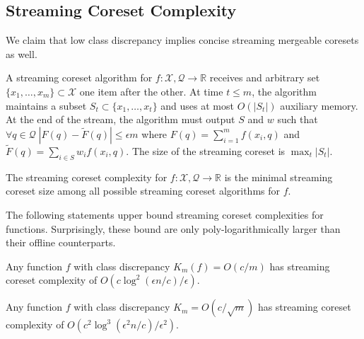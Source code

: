 \documentclass[anon,12pt]{colt2019} %
\newcommand{\R}{\mathbb{R}}
\newcommand{\eps}{\epsilon}
\newcommand{\X}{\mathcal{X}}
\newcommand{\Q}{\mathcal{Q}}
\begin{document}
\subsection{Streaming Coreset Complexity}\label{sec:sketch}
We claim that low class discrepancy implies concise streaming mergeable coresets as well. 
%
\begin{definition}  
A streaming coreset algorithm for $f:\X,\Q \rightarrow \R$ receives and arbitrary set $\{x_1,\ldots,x_m\} \subset \X$ one item after the other.
At time $t \le m$, the algorithm maintains a subset $S_t \subset \{x_1,\ldots,x_t\}$ and uses at most $O(|S_t|)$ auxiliary memory. 
At the end of the stream, the algorithm must output $S$ and $w$ such that  $\forall q \in \Q \; |F(q)  - \tilde F(q)| \le \eps m$ where 
$F(q) = \sum_{i=1}^{m} f(x_i,q)$ and $\tilde F(q) = \sum_{i \in S}w_i f(x_i,q)$.
The size of the streaming coreset is $\max_t |S_t|$.
\end{definition}

\begin{definition}  
The streaming coreset complexity for $f:\X,\Q \rightarrow \R$ is the minimal streaming coreset size among all possible 
streaming coreset algorithms for $f$.
\end{definition}


\noindent The following statements upper bound streaming coreset complexities for functions. Surprisingly, these bound are only poly-logarithmically larger than their offline counterparts. 

\begin{theorem} \label{thm:streaming11}
Any function $f$ with class discrepancy $K_m(f) = O(c/m)$ has streaming coreset complexity of $O\left(c\log^2(\eps n/c)/\eps\right)$.
\end{theorem}

\begin{theorem} \label{thm:streaming21}
Any function $f$ with class discrepancy $K_m = O(c/\sqrt{m})$ has streaming coreset complexity of $O\left(c^2\log^3(\eps^2 n/c) /\eps^2\right)$.
\end{theorem}
\end{document}
